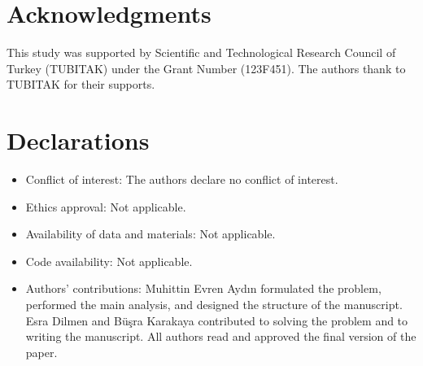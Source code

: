 \documentclass[12pt]{amsart}
\theoremstyle{definition}
\begin{document}
\section*{Acknowledgments}
This study was supported by Scientific and Technological Research Council of Turkey (TUBITAK) under the Grant Number (123F451). The authors thank to TUBITAK for their supports.

\section*{Declarations}

\begin{itemize}
\item Conflict of interest: The authors declare no conflict of interest.

\item Ethics approval: Not applicable.

\item Availability of data and materials: Not applicable.

\item Code availability: Not applicable.

\item Authors’ contributions: Muhittin Evren Aydın formulated the problem, performed the main analysis, and designed the structure of the manuscript. Esra Dilmen and Büşra Karakaya contributed to solving the problem and to writing the manuscript. All authors read and approved the final version of the paper.
\end{itemize}
\end{document}
